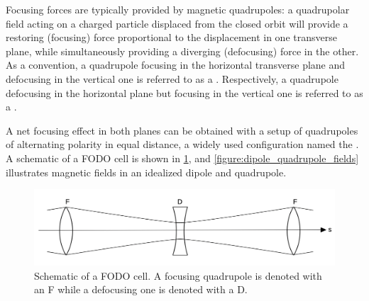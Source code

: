 Focusing forces are typically provided by magnetic quadrupoles: a quadrupolar field acting on a charged particle displaced from the closed orbit will provide a restoring (focusing) force proportional to the displacement in one transverse plane, while simultaneously providing a diverging (defocusing) force in the other. 
As a convention, a quadrupole focusing in the horizontal transverse plane and defocusing in the vertical one is referred to as a . 
Respectively, a quadrupole defocusing in the horizontal plane but focusing in the vertical one is referred to as a .

A net focusing effect in both planes can be obtained with a setup of quadrupoles of alternating polarity in equal distance, a widely used configuration named the .
A schematic of a FODO cell is shown in \cref{figure:fodo_cell_schematic}, and \cref{figure:dipole_quadrupole_fields} illustrates magnetic fields in an idealized dipole and quadrupole.

\begin{figure}[!htb]
    \begin{center}
    \includegraphics[width = 0.8\linewidth]{Figures/Beam_Dynamics_Theory/fodo_cell_schematic.png}
    \caption{Schematic of a FODO cell. A focusing quadrupole is denoted with an F while a defocusing one is denoted with a D.}
    \label{figure:fodo_cell_schematic}
    \end{center}
\end{figure}

